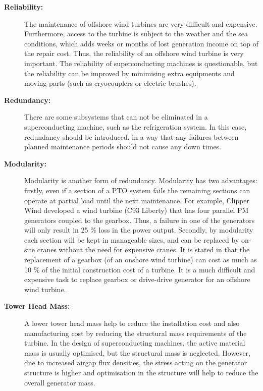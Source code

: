 \documentclass[12pt]{IET02}
\begin{document}
\begin{description}
  \item[\textbf{Reliability:}] The maintenance of offshore wind turbines are very difficult and expensive. Furthermore, access to the turbine is subject to the weather and the sea conditions, which adds weeks or months of lost generation income on top of the repair cost. Thus, the reliability of an offshore wind turbine is very important. The reliability of superconducting machines is questionable, but the reliability can be improved by minimising extra equipments and moving parts (such as cryocouplers or electric brushes). 

  \item[\textbf{Redundancy:}] There are some subsystems that can not be eliminated in a superconducting machine, such as the refrigeration system. In this case, redundancy should be introduced, in a way that any failures between planned maintenance periods should not cause any down times.

  \item[\textbf{Modularity:}] Modularity is another form of redundancy. Modularity has two advantages: firstly, even if a section of a PTO system fails the remaining sections can operate at partial load until the next maintenance. For example, Clipper Wind developed a wind turbine (C93 Liberty) that has four parallel PM generators coupled to the gearbox. Thus, a failure in one of the generators will only result in 25 \% loss in the power output. Secondly, by modularity each section will be kept in manageable sizes, and can be replaced by on-site cranes without the need for expensive cranes. It is stated in \cite{Kaiser2007} that the replacement of a gearbox (of an onshore wind turbine) can cost as much as 10 \% of the initial construction cost of a turbine. It is a much difficult and expensive task to replace gearbox or drive-drive generator for an offshore wind turbine.

  \item[\textbf{Tower Head Mass:}] A lower tower head mass help to reduce the installation cost and also manufacturing cost by reducing the structural mass requirements of the turbine. In the design of superconducting machines, the active material mass is usually optimised, but the structural mass is neglected. However, due to increased airgap flux densities, the stress acting on the generator structure is higher and optimisation in the structure will help to reduce the overall generator mass.

 \end{description}
\end{document}

